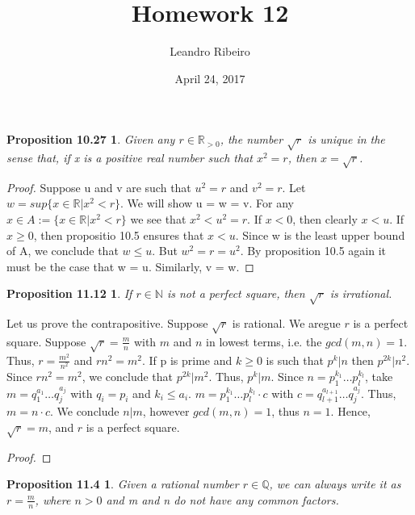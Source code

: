 \documentclass[12pt]{amsart}
\newcommand{\N}{\mathbb{N}}
\newcommand{\R}{\mathbb{R}}
\newcommand{\Q}{\mathbb{Q}}
\begin{document}
\title{Homework 12}
\date{April 24, 2017}
\author{Leandro Ribeiro}

\maketitle

\newtheorem*{prop10.27}{Proposition 10.27}
\begin{prop10.27}
	Given any $r \in \R_{>0}$, the number $\sqrt{r}$ is unique in the sense that, if x is a positive real number such that $x^2 = r$, then $x = \sqrt{r}$.
\end{prop10.27}

\begin{proof}
	Suppose u and v are such that $u^2 = r$ and $v^2 = r$. Let $w = sup\{x \in \R | x^2 < r\}$. We will show u = w = v. For any $x \in A := \{x \in \R | x^2 < r\}$ we see that $x^2 < u^2 = r$. If $x < 0$, then clearly $x < u$. If $x \geq 0$, then propositio 10.5 ensures that $x < u$. Since w is the least upper bound of A, we conclude that $w \leq u$. But $w^2 = r = u^2$. By proposition 10.5 again it must be the case that w = u. Similarly, v = w.
\end{proof}

\newtheorem*{prop11.12}{Proposition 11.12}

\begin{prop11.12}
	If $r \in \N$ is not a perfect square, then $\sqrt{r}$ is irrational.
\end{prop11.12}
Let us prove the contrapositive. Suppose $\sqrt{r}$ is rational. We aregue $r$ is a perfect square. Suppose $\sqrt{r} = \frac{m}{n}$ with $m$ and $n$ in lowest terms, i.e. the $gcd(m,n)=1$. Thus, $r=\frac{m^2}{n^2}$ and $rn^2 = m^2$. If p is prime and $k \geq 0$ is such that $p^k|n$ then $p^{2k}|n^2$. Since $rn^2 = m^2$, we conclude that $p^{2k}|m^2$. Thus, $p^k|m$. Since $n = p_1^{k_1}\dots p_l^{k_l}$, take $m = q_1^{a_1}\dots q_j^{a_j}$ with $q_i=p_i$ and $k_i \leq a_i$. $m = p_1^{k_1} \dots p_l^{k_l} \cdot c$ with $c = q_{l+1}^{a_{l+1}} \dots q_{j}^{a_j}$. Thus, $m = n \cdot c$. We conclude $n | m$, however $gcd(m,n)=1$, thus $n=1$. Hence, $\sqrt{r} = m$, and $r$ is a perfect square.
\begin{proof}

\end{proof}

\newtheorem*{prop11.4}{Proposition 11.4}
\begin{prop11.4}
	Given a rational number $r \in \Q$, we can always write it as $r = \frac{m}{n}$, where $n > 0$ and m and n do not have any common factors.
\end{prop11.4}
\end{document}

